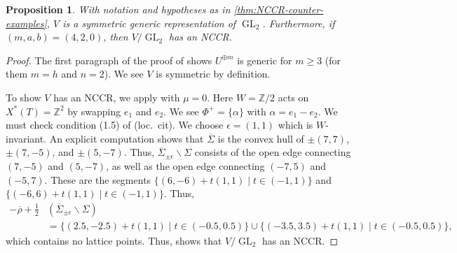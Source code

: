 \documentclass[12pt,a4paper]{amsart}
\newtheorem{proposition}[proposition]{Proposition}
\theoremstyle{definition}
\renewcommand{\setminus}{\smallsetminus}
\newcommand{\ZZ}{\mathbb{Z}}
\renewcommand{\1}{\textbf{1}}
\newcommand{\<}{\langle}
\renewcommand{\>}{\rangle}
\DeclareMathOperator{\GL}{GL}
\begin{document}
\begin{proposition}\label{prop:mab=420-has-NCCR}
	With notation and hypotheses as in \autoref{thm:NCCR-counter-examples}, $V$ is a symmetric generic representation of $\GL_2$. Furthermore, if $(m,a,b)=(4,2,0)$, then $V/\GL_2$ has an NCCR.
\end{proposition}
\begin{proof}
	The first paragraph of the proof of \cite[Theorem 5.2.1]{SpenkoVanDenBergh17} shows $U^{\oplus m}$ is generic for $m\geq3$ (for them $m=h$ and $n=2$). We see $V$ is symmetric by definition.
	
	To show $V$ has an NCCR, we apply \cite[Theorem 1.6.4]{SpenkoVanDenBergh17} with $\mu=0$. Here $W=\ZZ/2$ acts on $X^*(T)=\ZZ^2$ by swapping $e_1$ and $e_2$. We see $\Phi^+=\{\alpha\}$ with $\alpha=e_1-e_2$. We must check condition (1.5) of (loc.~cit). We choose $\epsilon=(1,1)$ which is $W$-invariant. An explicit computation shows that $\overline{\Sigma}$ is the convex hull of $\pm(7,7)$, $\pm(7,-5)$, and $\pm(5,-7)$. Thus, $\overline{\Sigma}_{\pm\epsilon}\setminus\Sigma$ consists of the open edge connecting $(7,-5)$ and $(5,-7)$, as well as the open edge connecting $(-7,5)$ and $(-5,7)$. These are the segments $\{(6,-6) + t(1,1) \mid t\in(-1,1)\}$ and $\{(-6,6) + t(1,1) \mid t\in(-1,1)\}$. Thus, 
\begin{align*}
	-\overline{\rho}+\frac{1}{2}&(\overline{\Sigma}_{\pm\epsilon}\setminus\Sigma) \\
	 &= \{(2.5,-2.5) + t(1,1) \mid t\in(-0.5,0.5)\} \cup \{(-3.5,3.5) + t(1,1) \mid t\in(-0.5,0.5)\},
\end{align*}
which contains no lattice points. Thus, \cite[Theorem 1.6.4]{SpenkoVanDenBergh17} shows that $V/\GL_2$ has an NCCR.
\end{proof}
\end{document}
